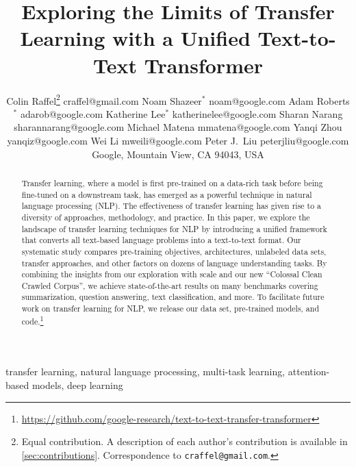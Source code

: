 \documentclass[twoside,11pt]{article}
\begin{document}
\title{Exploring the Limits of Transfer Learning with a Unified Text-to-Text Transformer}

\author{\name Colin Raffel\thanks{Equal contribution. A description of each author's contribution is available in \cref{sec:contributions}. Correspondence to \texttt{craffel@gmail.com}.} \email craffel@gmail.com
  \AND
  \name Noam Shazeer$^*$ \email noam@google.com
  \AND
  \name Adam Roberts$^*$ \email adarob@google.com
  \AND
  \name Katherine Lee$^*$ \email katherinelee@google.com
  \AND
  \name Sharan Narang \email sharannarang@google.com
  \AND
  \name Michael Matena \email mmatena@google.com
  \AND
  \name Yanqi Zhou \email yanqiz@google.com
  \AND
  Wei Li \email mweili@google.com
  \AND
  \name Peter J.\ Liu \email peterjliu@google.com
  \AND \addr Google, Mountain View, CA 94043, USA
}


\maketitle

\begin{abstract}
Transfer learning, where a model is first pre-trained on a data-rich task before being fine-tuned on a downstream task, has emerged as a powerful technique in natural language processing (NLP).
The effectiveness of transfer learning has given rise to a diversity of approaches, methodology, and practice.
In this paper, we explore the landscape of transfer learning techniques for NLP by introducing a unified framework that converts all text-based language problems into a text-to-text format.
Our systematic study compares pre-training objectives, architectures, unlabeled data sets, transfer approaches, and other factors on dozens of language understanding tasks.
By combining the insights from our exploration with scale and our new ``Colossal Clean Crawled Corpus'', we achieve state-of-the-art results on many benchmarks covering summarization, question answering, text classification, and more.
To facilitate future work on transfer learning for NLP, we release our data set, pre-trained models, and code.\footnote{\label{fn:oss}\url{https://github.com/google-research/text-to-text-transfer-transformer}}
\end{abstract}

\begin{keywords}
  transfer learning, natural language processing, multi-task learning, attention-based models, deep learning
\end{keywords}
\end{document}

